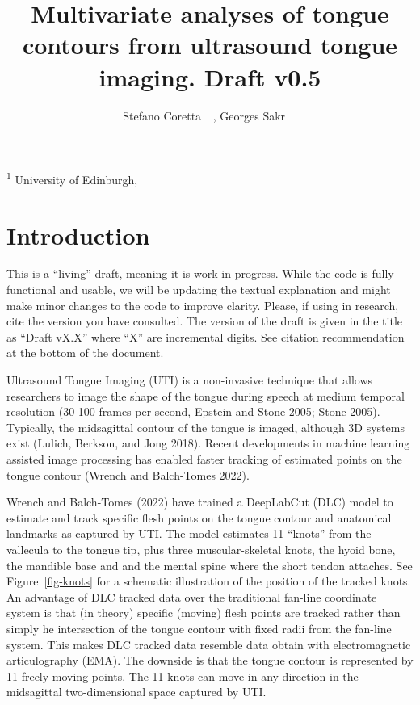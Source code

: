 \documentclass[
]{interact}
\title{Multivariate analyses of tongue contours from ultrasound tongue
imaging. Draft v0.5}
\author{Stefano
Coretta$\textsuperscript{1}$~\orcidlink{0000-0001-9627-5532}, Georges
Sakr$\textsuperscript{1}$~\orcidlink{0000-0003-3813-2669}}
\begin{document}
\captionsetup{labelsep=space}
\maketitle
\textsuperscript{1}  University of Edinburgh,  


\section{Introduction}\label{introduction}

\begin{tcolorbox}[enhanced jigsaw, bottomtitle=1mm, rightrule=.15mm, arc=.35mm, coltitle=black, bottomrule=.15mm, breakable, toprule=.15mm, toptitle=1mm, colback=white, colbacktitle=quarto-callout-warning-color!10!white, title=\textcolor{quarto-callout-warning-color}{\faExclamationTriangle}\hspace{0.5em}{Warning}, opacityback=0, titlerule=0mm, colframe=quarto-callout-warning-color-frame, leftrule=.75mm, left=2mm, opacitybacktitle=0.6]

This is a ``living'' draft, meaning it is work in progress. While the
code is fully functional and usable, we will be updating the textual
explanation and might make minor changes to the code to improve clarity.
Please, if using in research, cite the version you have consulted. The
version of the draft is given in the title as ``Draft vX.X'' where ``X''
are incremental digits. See citation recommendation at the bottom of the
document.

\end{tcolorbox}

Ultrasound Tongue Imaging (UTI) is a non-invasive technique that allows
researchers to image the shape of the tongue during speech at medium
temporal resolution (30-100 frames per second, Epstein and Stone 2005;
Stone 2005). Typically, the midsagittal contour of the tongue is imaged,
although 3D systems exist (Lulich, Berkson, and Jong 2018). Recent
developments in machine learning assisted image processing has enabled
faster tracking of estimated points on the tongue contour (Wrench and
Balch-Tomes 2022).

Wrench and Balch-Tomes (2022) have trained a DeepLabCut (DLC) model to
estimate and track specific flesh points on the tongue contour and
anatomical landmarks as captured by UTI. The model estimates 11
``knots'' from the vallecula to the tongue tip, plus three
muscular-skeletal knots, the hyoid bone, the mandible base and and the
mental spine where the short tendon attaches. See Figure~\ref{fig-knots}
for a schematic illustration of the position of the tracked knots. An
advantage of DLC tracked data over the traditional fan-line coordinate
system is that (in theory) specific (moving) flesh points are tracked
rather than simply he intersection of the tongue contour with fixed
radii from the fan-line system. This makes DLC tracked data resemble
data obtain with electromagnetic articulography (EMA). The downside is
that the tongue contour is represented by 11 freely moving points. The
11 knots can move in any direction in the midsagittal two-dimensional
space captured by UTI.
\end{document}
